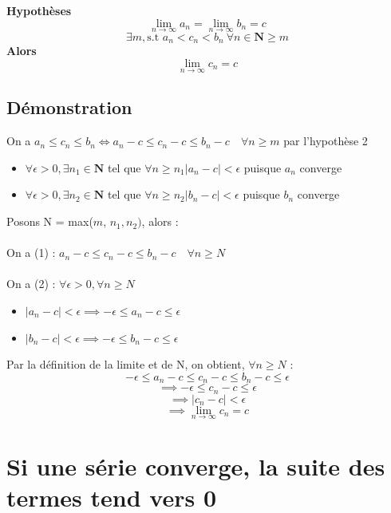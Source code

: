 \documentclass{article}
\begin{document}
\textbf{Hypothèses} \\
\[ \lim_{n\to\infty}a_n = \lim_{n\to\infty}b_n = c \]
\[ \exists m, \text{s.t } a_n < c_n < b_n\ \forall n \in \mathbf{N} \geq m \]
\textbf{Alors} \\
\[ \lim_{n\to\infty}c_n = c \]

\subsection{Démonstration}

On a $a_n \leq c_n \leq b_n \Leftrightarrow a_n - c \leq c_n - c \leq b_n - c \quad \forall n \geq m$ par l'hypothèse 2 \\
\begin{itemize}
    \item $\forall \epsilon > 0,\exists n_1 \in \mathbf{N}$ tel que $\forall n\geq n_1 \lvert a_n - c \lvert < \epsilon$ puisque $a_n$ converge
    \item $\forall \epsilon > 0,\exists n_2 \in \mathbf{N}$ tel que $\forall n\geq n_2 \lvert b_n - c \lvert < \epsilon$ puisque $b_n$ converge
\end{itemize}
Posons N = max($m$, $n_1, n_2)$, alors : \\\\
On a (1) : $a_n - c \leq c_n - c \leq b_n - c \quad \forall n \geq N$\\\\
On a (2) : $\forall \epsilon > 0, \forall n\geq N$
\begin{itemize}
    \item $ \lvert a_n - c \lvert < \epsilon \implies -\epsilon \leq a_n - c \leq \epsilon$
    \item $ \lvert b_n - c \lvert < \epsilon \implies -\epsilon \leq b_n - c \leq \epsilon$
\end{itemize}
Par la définition de la limite et de N, on obtient, $\forall n\geq N$ :
\[ -\epsilon \leq a_n - c \leq c_n - c \leq b_n - c \leq \epsilon  \]
\[ \implies -\epsilon\leq c_n - c \leq \epsilon \]
\[ \implies \lvert c_n - c \lvert < \epsilon \]
\[ \implies \lim_{n\to\infty}c_n = c \]

\newpage

\section{Si une série converge, la suite des termes tend vers 0}
\end{document}
